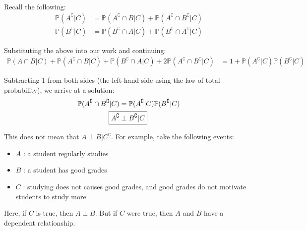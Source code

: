 \documentclass[titlepage, 12pt, leqno]{article}
\begin{document}
Recall the following:
\begin{align*}
    \mathbb{P}(A^\complement |C) &= \mathbb{P}(A^\complement \cap B|C) +
    \mathbb{P}(A^\complement \cap B^\complement |C) \\
    \mathbb{P}(B^\complement |C) &= \mathbb{P}(B^\complement \cap A|C) +
    \mathbb{P}(B^\complement \cap A^\complement |C)
\end{align*}

Substituting the above into our work and continuing:
\begin{align*}
    \mathbb{P}(A \cap B|C) + \mathbb{P}(A^\complement \cap B|C) + \mathbb{P}(
    B^\complement \cap A|C) + 2\mathbb{P}(A^\complement \cap B^\complement |C) &=
    1+\mathbb{P}(A^\complement |C)\mathbb{P}(B^\complement |C)
\end{align*}

Subtracting 1 from both sides (the left-hand side using the law of total 
probability), we arrive at a solution:
\begin{align*}
    \mathbb{P}(A^\complement \cap B^\complement |C) &= \mathbb{P}(A^\complement
    |C)\mathbb{P}(B^\complement |C) \\
    \Aboxed{A^\complement &\perp B^\complement |C} 
\end{align*}

This does not mean that $A\perp B|C^\complement $. For example, take the following
events:
\begin{itemize}
    \item $A$ : a student regularly studies
    \item $B$ : a student has good grades
    \item  $C$ : studying does not causes good grades, and good grades 
        do not motivate students to study more
\end{itemize}
Here, if $C$ is true, then $A \perp B$. But if $C$ were true, then $A$ and $B$ 
have a dependent relationship.
\end{document}

